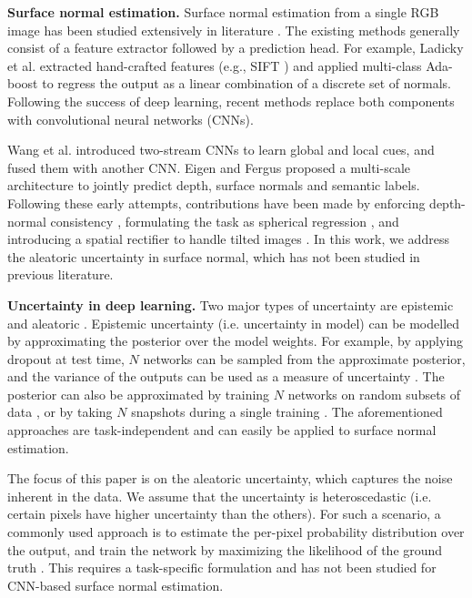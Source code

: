 \documentclass[10pt,twocolumn,letterpaper]{article}
\begin{document}
\noindent
\textbf{Surface normal estimation.} Surface normal estimation from a single RGB image has been studied extensively in literature \cite{SNfromRGB_13_3DP,SNfromRGB_14_Fouhey,SNfromRGB_14_Ladicky,SNfromRGB_15_Deep3D,SNfromRGB_15_Eigen,SNfromRGB_16_SkipNet,SNfromRGB_16_SURGE,SNfromRGB_18_GeoNet,SNfromRGB_19_FrameNet,SNfromRGB_19_PAP,SNfromRGB_19_SR,SNfromRGB_20_GeoNet++,SNfromRGB_20_TiltedSN,SNfromRGB_20_VPLNet}. The existing methods generally consist of a feature extractor followed by a prediction head. For example, Ladicky et al. \cite{SNfromRGB_14_Ladicky} extracted hand-crafted features (e.g., SIFT \cite{sift}) and applied multi-class Ada-boost \cite{adaboost} to regress the output as a linear combination of a discrete set of normals. Following the success of deep learning, recent methods replace both components with convolutional neural networks (CNNs). 

Wang et al. \cite{SNfromRGB_15_Deep3D} introduced two-stream CNNs to learn global and local cues, and fused them with another CNN. Eigen and Fergus \cite{SNfromRGB_15_Eigen} proposed a multi-scale architecture to jointly predict depth, surface normals and semantic labels. Following these early attempts, contributions have been made by enforcing depth-normal consistency \cite{SNfromRGB_18_GeoNet,SNfromRGB_20_GeoNet++}, formulating the task as spherical regression \cite{SNfromRGB_19_SR}, and introducing a spatial rectifier to handle tilted images \cite{SNfromRGB_20_TiltedSN}. In this work, we address the aleatoric uncertainty in surface normal, which has not been studied in previous literature.

\noindent
\textbf{Uncertainty in deep learning.} Two major types of uncertainty are epistemic and aleatoric \cite{aleatory_or_epistemic}. Epistemic uncertainty (i.e. uncertainty in model) can be modelled by approximating the posterior over the model weights. For example, by applying dropout \cite{dropout} at test time, $N$ networks can be sampled from the approximate posterior, and the variance of the outputs can be used as a measure of uncertainty \cite{epiU-drop-gal}. The posterior can also be approximated by training $N$ networks on random subsets of data \cite{epiU-2017-boot}, or by taking $N$ snapshots during a single training \cite{epiU-2017-snap}. The aforementioned approaches are task-independent and can easily be applied to surface normal estimation.

The focus of this paper is on the aleatoric uncertainty, which captures the noise inherent in the data. We assume that the uncertainty is heteroscedastic \cite{what_uncertainties} (i.e. certain pixels have higher uncertainty than the others). For such a scenario, a commonly used approach is to estimate the per-pixel probability distribution over the output, and train the network by maximizing the likelihood of the ground truth \cite{what_uncertainties,prob_deep_net}. This requires a task-specific formulation and has not been studied for CNN-based surface normal estimation.
\end{document}
